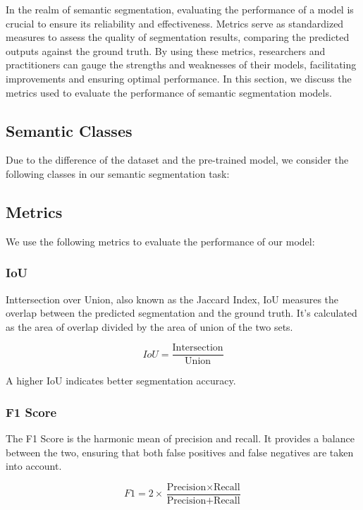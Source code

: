 \documentclass[11pt, a4paper,oneside,chapterprefix=false]{scrbook}
\begin{document}
In the realm of semantic segmentation, evaluating the performance of a model is crucial to ensure its reliability and effectiveness. Metrics serve as standardized measures to assess the quality of segmentation results, comparing the predicted outputs against the ground truth. By using these metrics, researchers and practitioners can gauge the strengths and weaknesses of their models, facilitating improvements and ensuring optimal performance. In this section, we discuss the metrics used to evaluate the performance of semantic segmentation models.

\subsection{Semantic Classes}

Due to the difference of the dataset and the pre-trained model, we consider the following classes in our semantic segmentation task:

\subsection{Metrics}

We use the following metrics to evaluate the performance of our model:

\subsubsection{IoU}

Inttersection over Union, also known as the Jaccard Index, IoU measures the overlap between the predicted segmentation and the ground truth. It's calculated as the area of overlap divided by the area of union of the two sets.

\begin{equation}
	IoU = \frac{\text{Intersection}}{\text{Union}}
\end{equation}

A higher IoU indicates better segmentation accuracy.

\subsubsection{F1 Score}

The F1 Score is the harmonic mean of precision and recall. It provides a balance between the two, ensuring that both false positives and false negatives are taken into account.

\begin{equation}
	F1 = 2 \times \frac{\text{Precision} \times \text{Recall}}{\text{Precision} + \text{Recall}}
\end{equation}
\end{document}
